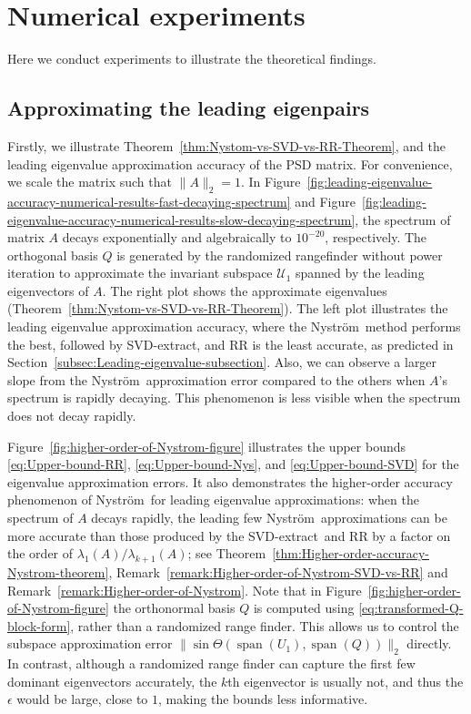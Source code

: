 \documentclass[onefignum,onetabnum]{siamart251216}
\def\Nystrom{Nystr{\"o}m}
\def\svdmethod{SVD-extract}
\def\leadingsubspace{\mathcal{U}_1}
\newcommand{\image}{\operatorname{span}}
\begin{document}
\section{Numerical experiments}
\label{sec:Numerical-illustrations-section}
Here we conduct experiments to illustrate the theoretical findings.
\subsection{Approximating the leading eigenpairs} 
Firstly, we illustrate Theorem~\ref{thm:Nystom-vs-SVD-vs-RR-Theorem}, and the leading eigenvalue approximation accuracy of the PSD matrix. For convenience, we scale the matrix such that $\|A\|_2=1$. In Figure~\ref{fig:leading-eigenvalue-accuracy-numerical-results-fast-decaying-spectrum} and Figure~\ref{fig:leading-eigenvalue-accuracy-numerical-results-slow-decaying-spectrum}, the spectrum of matrix $A$ decays exponentially and algebraically to $10^{-20}$, respectively. The orthogonal basis $Q$ is generated by the randomized rangefinder without power iteration \cite[Algorithm~9]{martinsson2020randomized} to approximate the invariant subspace $\leadingsubspace$ spanned by the leading eigenvectors of $A$. The right plot shows the approximate eigenvalues (Theorem~\ref{thm:Nystom-vs-SVD-vs-RR-Theorem}). The left plot illustrates the leading eigenvalue approximation accuracy, where the \Nystrom\ method performs the best, followed by \svdmethod, and RR is the least accurate, as predicted in Section~\ref{subsec:Leading-eigenvalue-subsection}. Also, we can observe a larger slope from the \Nystrom\ approximation error compared to the others when $A$'s spectrum is rapidly decaying. This phenomenon is less visible when the spectrum does not decay rapidly. 

Figure~\ref{fig:higher-order-of-Nystrom-figure} illustrates the upper bounds \eqref{eq:Upper-bound-RR}, \eqref{eq:Upper-bound-Nys}, and \eqref{eq:Upper-bound-SVD} for the eigenvalue approximation errors. It also demonstrates the higher-order accuracy phenomenon of \Nystrom\ for leading eigenvalue approximations: when the spectrum of $A$ decays rapidly, the leading few \Nystrom\ approximations can be more accurate than those produced by the \svdmethod\ and RR by a factor on the order of $\lambda_{1}(A)/\lambda_{k+1}(A)$; see Theorem~\ref{thm:Higher-order-accuracy-Nystrom-theorem}, Remark~\ref{remark:Higher-order-of-Nystrom-SVD-vs-RR} and Remark~\ref{remark:Higher-order-of-Nystrom}. Note that in Figure~\ref{fig:higher-order-of-Nystrom-figure} the orthonormal basis $Q$ is computed using \eqref{eq:transformed-Q-block-form}, rather than a randomized range finder. This allows us to control the subspace approximation error $\|\sin \Theta(\image(U_1), \image(Q))\|_2$ directly. In contrast, although a randomized range finder can capture the first few dominant eigenvectors accurately, the $k$th eigenvector is usually not, and thus the $\epsilon$ would be large, close to $1$, making the bounds less informative. 
\end{document}
